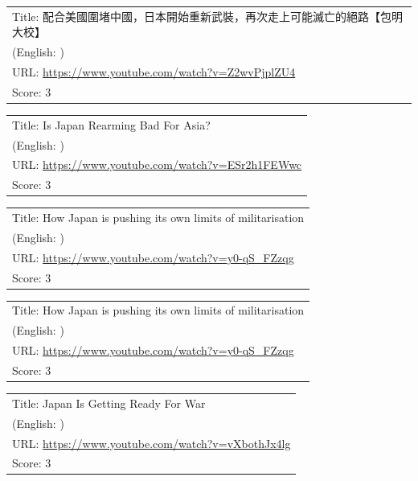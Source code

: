 \documentclass{article}
\begin{document}
\noindent
\begin{tabular}{p{}}
Title: 配合美國圍堵中國，日本開始重新武裝，再次走上可能滅亡的絕路【包明大校】 \\
(English: ) \\
URL: \url{https://www.youtube.com/watch?v=Z2wvPjplZU4} \\
Score: 3 \\
\end{tabular}
\vspace{0.5em}

\noindent
\begin{tabular}{p{}}
Title: Is Japan Rearming Bad For Asia? \\
(English: ) \\
URL: \url{https://www.youtube.com/watch?v=ESr2h1FEWwc} \\
Score: 3 \\
\end{tabular}
\vspace{0.5em}

\noindent
\begin{tabular}{p{}}
Title: How Japan is pushing its own limits of militarisation \\
(English: ) \\
URL: \url{https://www.youtube.com/watch?v=y0-qS_FZzqg} \\
Score: 3 \\
\end{tabular}
\vspace{0.5em}

\noindent
\begin{tabular}{p{}}
Title: How Japan is pushing its own limits of militarisation \\
(English: ) \\
URL: \url{https://www.youtube.com/watch?v=y0-qS_FZzqg} \\
Score: 3 \\
\end{tabular}
\vspace{0.5em}

\noindent
\begin{tabular}{p{}}
Title: Japan Is Getting Ready For War \\
(English: ) \\
URL: \url{https://www.youtube.com/watch?v=vXbothJx4lg} \\
Score: 3 \\
\end{tabular}
\vspace{0.5em}
\end{document}

